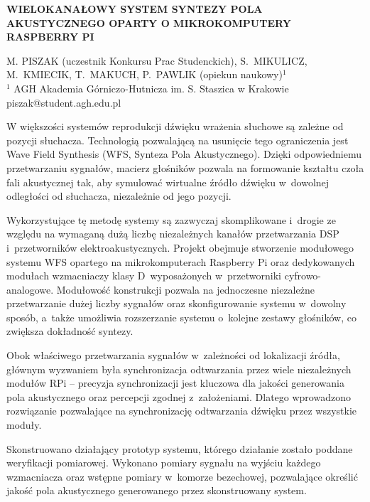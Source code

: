 \documentclass[10pt, a4paper]{article}
\begin{document}
\pagestyle{empty}

\begin{center}
	\large\textbf{\MakeUppercase{Wielokanałowy system syntezy pola akustycznego oparty o mikrokomputery Raspberry Pi}}
\end{center}
\vspace{22pt}

\noindent\MakeUppercase{M. Piszak} (uczestnik Konkursu Prac Studenckich), \MakeUppercase{S.~Mikulicz, M.~Kmiecik,} \linebreak \MakeUppercase{T.~Makuch, P.~Pawlik} (opiekun naukowy)$^1$\\

\noindent$^1$ AGH Akademia Górniczo-Hutnicza im. S. Staszica w Krakowie\\

\noindent piszak@student.agh.edu.pl

\vspace{22pt}

W większości systemów reprodukcji dźwięku wrażenia słuchowe są zależne od pozycji słuchacza. Technologią pozwalającą na usunięcie tego ograniczenia jest Wave Field Synthesis (WFS, Synteza Pola Akustycznego). Dzięki odpowiedniemu przetwarzaniu sygnałów, macierz głośników pozwala na formowanie kształtu czoła fali akustycznej tak, aby symulować wirtualne źródło dźwięku w~dowolnej odległości od słuchacza, niezależnie od jego pozycji.

Wykorzystujące tę metodę systemy są zazwyczaj skomplikowane i~drogie ze względu na wymaganą dużą liczbę niezależnych kanałów przetwarzania DSP i~przetworników elektroakustycznych. Projekt obejmuje stworzenie modułowego systemu WFS opartego na mikrokomputerach Raspberry Pi oraz dedykowanych modułach wzmacniaczy klasy D~wyposażonych w~przetworniki cyfrowo-analogowe. Modułowość konstrukcji pozwala na jednoczesne niezależne przetwarzanie dużej liczby sygnałów oraz skonfigurowanie systemu w~dowolny sposób, a~także umożliwia rozszerzanie systemu o~kolejne zestawy głośników, co zwiększa dokładność syntezy.

Obok właściwego przetwarzania sygnałów w~zależności od lokalizacji źródła, głównym wyzwaniem była synchronizacja odtwarzania przez wiele niezależnych modułów RPi -- precyzja synchronizacji jest kluczowa dla jakości generowania pola akustycznego oraz percepcji zgodnej z~założeniami. Dlatego wprowadzono rozwiązanie pozwalające na synchronizację odtwarzania dźwięku przez wszystkie moduły.

Skonstruowano działający prototyp systemu, którego działanie zostało poddane weryfikacji pomiarowej. Wykonano pomiary sygnału na wyjściu każdego wzmacniacza oraz wstępne pomiary w~komorze bezechowej, pozwalające określić jakość pola akustycznego generowanego przez skonstruowany system.
\end{document}
